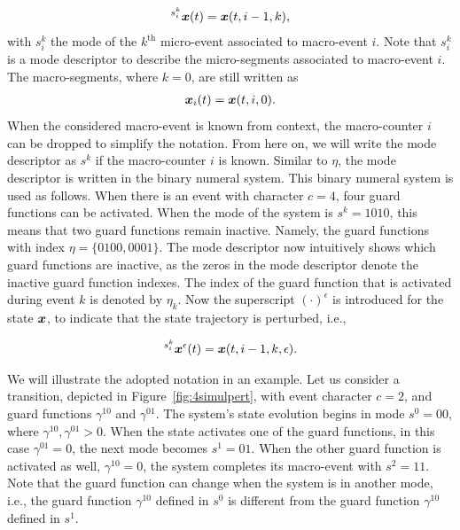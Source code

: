 \documentclass[../DC2017114Bouma.tex]{subfiles}
\begin{document}
\begin{align}
\hspace{0cm}^{s^k_i}{\boldsymbol{x}}(t) = {\boldsymbol{x}}(t,i-1,k),
\end{align}
with $s^k_i$ the mode of the $k^{\text{th}}$ micro-event associated to macro-event $i$. Note that $s_i^k$ is a mode descriptor to describe the micro-segments associated to macro-event $i$. The macro-segments, where $k=0$, are still written as 
\begin{align}
{\boldsymbol{x}}_i(t) = {\boldsymbol{x}}(t,i,0).
\end{align}
When the considered macro-event is known from context, the macro-counter $i$ can be dropped to simplify the notation. From here on, we will write the mode descriptor as $s^k$ if the macro-counter $i$ is known. Similar to $\eta$, the mode descriptor is written in the binary numeral system. This binary numeral system is used as follows. When there is an event with character $c = 4$, four guard functions can be activated. When the mode of the system is $s^k = 1010$, this means that two guard functions remain inactive. Namely, the guard functions with index $\eta = \{0100,0001\}$. The mode descriptor now intuitively shows which guard functions are inactive, as the zeros in the mode descriptor denote the inactive guard function indexes. The index of the guard function that is activated during event $k$ is denoted by $\eta_k$. Now the superscript $(\cdot)^{\epsilon}$ is introduced for the state ${\boldsymbol{x}}$, to indicate that the state trajectory is perturbed, i.e.,

\begin{align}
\hspace{0cm}^{s^k_i}{\boldsymbol{x}}^{\epsilon}(t) = {\boldsymbol{x}}(t,i-1,k,\epsilon).
\end{align}

We will illustrate the adopted notation in an example. Let us consider a transition, depicted in Figure~\ref{fig:4simulpert}, with event character $c = 2$, and guard functions $\gamma^{10}$ and $\gamma^{01}$. The system's state evolution begins in mode $s^0 = 00$, where $\gamma^{10},\gamma^{01}>0$. When the state activates one of the guard functions, in this case $\gamma^{01}=0$, the next mode becomes $s^1 = 01$. When the other guard function is activated as well, $\gamma^{10} = 0$, the system completes its macro-event with $s^2 = 11$. Note that the guard function can change when the system is in another mode, i.e., the guard function $\gamma^{10}$ defined in $s^0$ is different from the guard function $\gamma^{10}$ defined in $s^1$.
\end{document}
